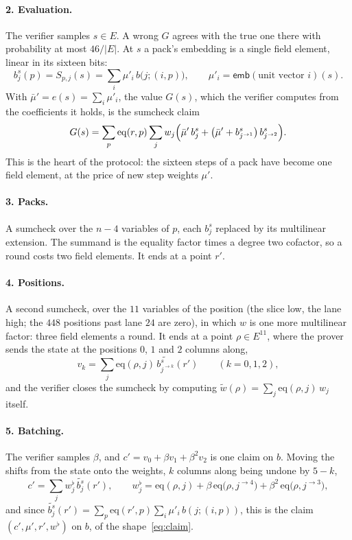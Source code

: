 \documentclass[11pt]{article}
\newcommand{\E}{E}
\newcommand{\eq}{\mathrm{eq}}
\newcommand{\mle}[1]{\widetilde{#1}}
\newcommand{\along}[2]{#1^{\rightarrow #2}}
\newcommand{\emb}{\mathsf{emb}}
\begin{document}
\paragraph{2. Evaluation.} The verifier samples $s \in \E$. A wrong $G$ agrees with the true one there with probability at most $46/|\E|$. At $s$ a pack's embedding is a single field element, linear in its sixteen bits:
\[
b^s_j(p) = S_{p,j}(s) = \sum_i \mu'_i\, b\bigl(j; (i, p)\bigr), \qquad \mu'_i = \emb(\text{unit vector } i)(s).
\]
With $\bar\mu' = e(s) = \sum_i \mu'_i$, the value $G(s)$, which the verifier computes from the coefficients it holds, is the sumcheck claim
\begin{equation}\label{eq:at-s}
G(s) = \sum_{p} \eq(r, p) \sum_j w_j \Bigl(\bar\mu'\, b^s_j + \bigl(\bar\mu' + b^s_{\along{j}{1}}\bigr)\, b^s_{\along{j}{2}}\Bigr).
\end{equation}
This is the heart of the protocol: the sixteen steps of a pack have become one field element, at the price of new step weights $\mu'$.

\paragraph{3. Packs.} A sumcheck over the $n - 4$ variables of $p$, each $b^s_j$ replaced by its multilinear extension. The summand is the equality factor times a degree two cofactor, so a round costs two field elements. It ends at a point $r'$.

\paragraph{4. Positions.} A second sumcheck, over the $11$ variables of the position (the slice low, the lane high; the $448$ positions past lane $24$ are zero), in which $w$ is one more multilinear factor: three field elements a round. It ends at a point $\rho \in \E^{11}$, where the prover sends the state at the positions $0$, $1$ and $2$ columns along,
\[
v_k = \sum_j \eq(\rho, j)\, \mle{b^s_{\along{j}{k}}}(r') \qquad (k = 0, 1, 2),
\]
and the verifier closes the sumcheck by computing $\mle{w}(\rho) = \sum_j \eq(\rho, j)\, w_j$ itself.

\paragraph{5. Batching.} The verifier samples $\beta$, and $c' = v_0 + \beta v_1 + \beta^2 v_2$ is one claim on $b$. Moving the shifts from the state onto the weights, $k$ columns along being undone by $5 - k$,
\[
c' = \sum_j w^\flat_j\, \mle{b^s_j}(r'), \qquad w^\flat_j = \eq(\rho, j) + \beta\, \eq\bigl(\rho, \along{j}{4}\bigr) + \beta^2\, \eq\bigl(\rho, \along{j}{3}\bigr),
\]
and since $\mle{b^s_j}(r') = \sum_{p} \eq(r', p) \sum_i \mu'_i\, b(j; (i, p))$, this is the claim $(c', \mu', r', w^\flat)$ on $b$, of the shape~\eqref{eq:claim}.
\end{document}
